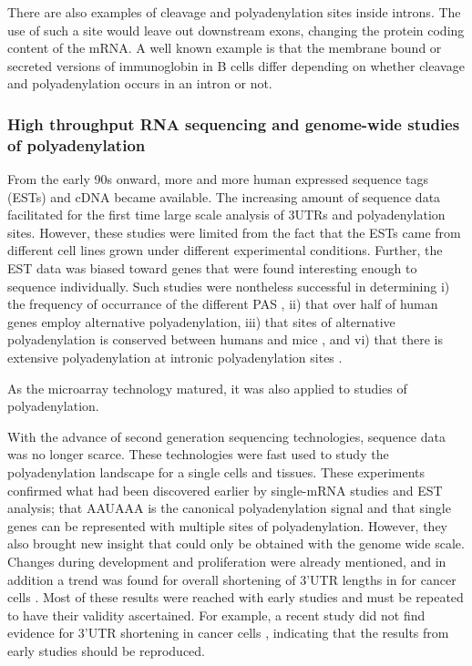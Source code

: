There are also examples of cleavage and polyadenylation sites inside introns.
The use of such a site would leave out downstream exons, changing the protein
coding content of the mRNA. A well known example is that the membrane bound or
secreted versions of immunoglobin in B cells differ depending on whether
cleavage and polyadenylation occurs in an intron or not.

\subsubsection{High throughput RNA sequencing and genome-wide studies of
polyadenylation}

From the early 90s onward, more and more human expressed sequence tags (ESTs)
and cDNA became available. The increasing amount of sequence data facilitated
for the first time large scale analysis of 3\p UTRs and polyadenylation sites.
However, these studies were limited from the fact that the ESTs came from
different cell lines grown under different experimental conditions. Further,
the EST data was biased toward genes that were found interesting enough to
sequence individually. Such studies were nontheless successful in determining
i) the frequency of occurrance of the different PAS
\cite{beaudoing_patterns_2000}, ii) that over half of human genes employ
alternative polyadenylation, iii) that sites of alternative polyadenylation is
conserved between humans and mice \cite{tian_large-scale_2005}, and vi) that
there is extensive polyadenylation at intronic polyadenylation sites
\cite{tian_widespread_2007}.

As the microarray technology matured, it was also applied to studies of
polyadenylation.

With the advance of second generation sequencing technologies, sequence data
was no longer scarce. These technologies were fast used to study the
polyadenylation landscape for a single cells and tissues. These experiments
confirmed what had been discovered earlier by single-mRNA studies and EST
analysis; that AAUAAA is the canonical polyadenylation signal and that single
genes can be represented with multiple sites of polyadenylation. However, they
also brought new insight that could only be obtained with the genome wide
scale. Changes during development and proliferation were already mentioned, and
in addition a trend was found for overall shortening of 3'UTR lengths in for
cancer cells \cite{mayr_widespread_2009}. Most of these results were
reached with early studies and must be repeated to have their validity
ascertained. For example, a recent study did not find evidence for 3'UTR
shortening in cancer cells \cite{fu_differential_2011}, indicating that the
results from early studies should be reproduced.

